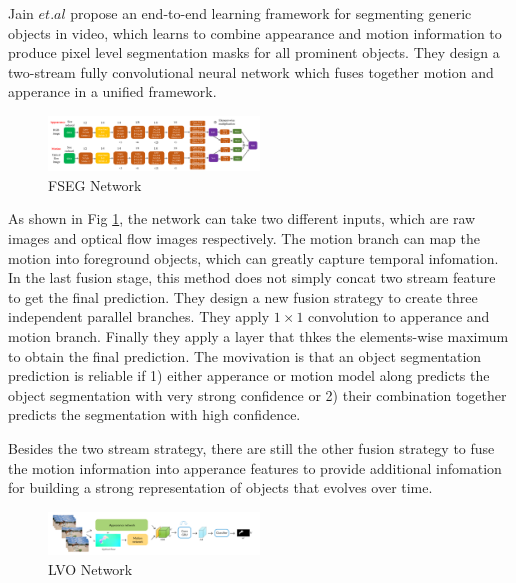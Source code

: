 Jain $et.al$ \cite{Jain2017FusionSeg} propose an end-to-end learning framework for segmenting generic objects in video,
which learns to combine appearance and motion information to produce pixel level segmentation masks for all prominent objects.
They design a two-stream fully convolutional neural network which fuses together motion and apperance in a unified framework.

\begin{figure}
    \begin{center}
    \includegraphics[width=0.5\textwidth]{figure/FSEG_NET.png}
    \end{center}
    \caption{FSEG Network}
    \label{FSEG}
\end{figure}

As shown in Fig \ref{FSEG}, the network can take two different inputs, which are raw images and optical flow images respectively.
The motion branch can map the motion into foreground objects, which can greatly capture temporal infomation.
In the last fusion stage, this method does not simply concat two stream feature to get the final prediction.
They design a new fusion strategy to create three independent parallel branches. They apply $1\times1$ convolution to apperance and
motion branch. Finally they apply a layer that thkes the elements-wise maximum to obtain the final prediction. The movivation is that 
an object segmentation prediction is reliable if 1) either apperance or motion model along predicts the object 
segmentation with very strong confidence or 2) their combination together predicts the segmentation with high confidence. 

Besides the two stream strategy, there are still the other fusion strategy to fuse the motion information into apperance 
features to provide additional infomation for building a strong representation of objects that evolves over time. 

\begin{figure}[ht]
    \centering
    \includegraphics[width=0.5\textwidth]{./figure/LVO_NET.png}
    \caption{LVO Network}
    \label{LVO}
\end{figure}


